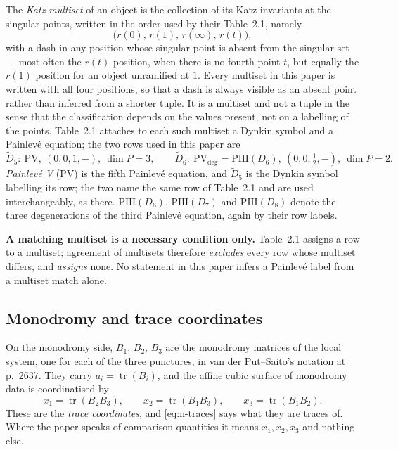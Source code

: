 The \emph{Katz multiset} of an object is the collection of its Katz invariants
at the singular points, written in the order used by their Table~2.1, namely
\[
  \bigl(r(0),\,r(1),\,r(\infty),\,r(t)\bigr),
\]
with a dash in any position whose singular point is absent from the singular
set --- most often the $r(t)$ position, when there is no fourth point $t$, but
equally the $r(1)$ position for an object unramified at $1$. Every multiset in
this paper is written with all four positions, so that a dash is always visible
as an absent point rather than inferred from a shorter tuple.
It is a multiset and not a tuple in the sense that the classification
depends on the values present, not on a labelling of the points. Table~2.1
attaches to each such multiset a Dynkin symbol and a Painlev\'e equation; the
two rows used in this paper are
\[
  \widetilde D_5:\ \mathrm{PV},\ (0,0,1,-),\ \dim P=3,
  \qquad
  \widetilde D_6:\ \mathrm{PV}_{\deg}=\mathrm{PIII}(D_6),\ (0,0,\tfrac12,-),\
  \dim P=2 .
\]
\emph{Painlev\'e V} (PV) is the fifth Painlev\'e equation, and $\widetilde D_5$
is the Dynkin symbol labelling its row; the two name the same row of Table~2.1
and are used interchangeably, as there. $\mathrm{PIII}(D_6)$, $\mathrm{PIII}(D_7)$
and $\mathrm{PIII}(D_8)$ denote the three degenerations of the third Painlev\'e
equation, again by their row labels.

\textbf{A matching multiset is a necessary condition only.} Table~2.1 assigns a
row to a multiset; agreement of multisets therefore \emph{excludes} every row
whose multiset differs, and \emph{assigns} none. No statement in this paper
infers a Painlev\'e label from a multiset match alone.

\subsection{Monodromy and trace coordinates}\label{ssec:traces}

On the monodromy side, $B_1$, $B_2$, $B_3$ are the monodromy matrices of the
local system, one for each of the three punctures, in van der Put--Saito's
notation at p.~2637. They carry $a_i=\operatorname{tr}(B_i)$, and the affine
cubic surface of monodromy data is coordinatised by
\begin{equation}\label{eq:n-traces}
  x_1=\operatorname{tr}(B_2B_3),\qquad
  x_2=\operatorname{tr}(B_1B_3),\qquad
  x_3=\operatorname{tr}(B_1B_2).
\end{equation}
These are the \emph{trace coordinates}, and \eqref{eq:n-traces} says what they
are traces of. Where the paper speaks of comparison quantities it means
$x_1,x_2,x_3$ and nothing else.

